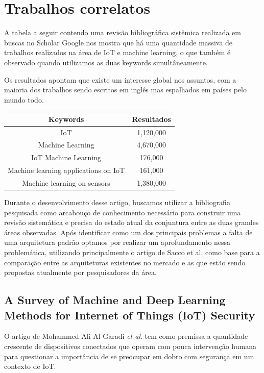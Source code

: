 \documentclass[12pt]{article}
\begin{document}
\section{Trabalhos correlatos}

A tabela a seguir contendo uma revisão bibliográfica sistêmica realizada em buscas no Scholar Google nos mostra que há uma quantidade massiva de trabalhos realizados na área de IoT e machine learning, o que também é observado quando utilizamos as duas keywords simultâneamente.

Os resultados apontam que existe um interesse global nos assuntos, com a maioria dos trabalhos sendo escritos em inglês mas espalhados em países pelo mundo todo.

\begin{center}
    \begin{tabular}{ | c | c | }
    \hline
    Keywords & Resultados \\ 
    \hline
    IoT & 1,120,000 \\  
    \hline
    Machine Learning & 4,670,000 \\
    \hline
    IoT Machine Learning & 176,000 \\
    \hline
    Machine learning applications on IoT & 161,000 \\
    \hline
    Machine learning on sensors & 1,380,000 \\
    \hline
    \end{tabular}
\end{center}

Durante o desenvolvimento desse artigo, buscamos utilizar a bibliografia pesquisada como arcabouço de conhecimento necessário para construir uma revisão sistemática e precisa do estado atual da conjuntura entre as duas grandes áreas observadas. Após identificar como um dos principais problemas a falta de uma arquitetura padrão optamos por realizar um aprofundamento nessa problemática, utilizando principalmente o artigo de Sacco et al. \cite{sacco} como base para a comparação entre as arquiteturas existentes no mercado e as que estão sendo propostas atualmente por pesquisadores da área.

\subsection{A Survey of Machine and Deep Learning Methods for Internet of Things (IoT) Security \cite{ali}}

O artigo de Mohammed Ali Al-Garadi \emph{et al}. tem como premissa a
quantidade crescente de dispositivos conectados que operam com
pouca intervenção humana para questionar a importância de se preocupar em dobro com segurança
em um contexto de IoT.
\end{document}
